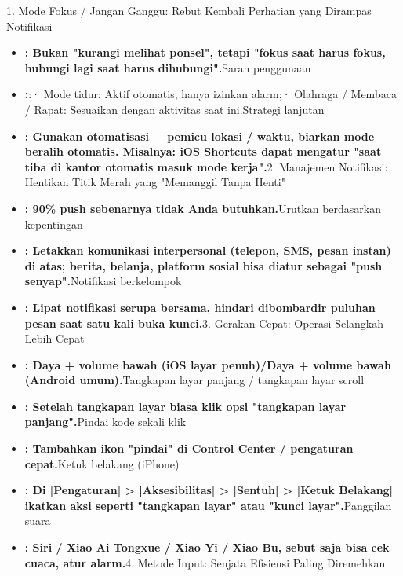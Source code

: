 
1. Mode Fokus / Jangan Ganggu: Rebut Kembali Perhatian yang Dirampas Notifikasi


\begin{itemize}
  \item \textbf{: Bukan "kurangi melihat ponsel", tetapi "fokus saat harus fokus, hubungi lagi saat harus dihubungi".}Saran penggunaan
  \item \textbf{:}:\newline · Mode tidur: Aktif otomatis, hanya izinkan alarm;\newline · Olahraga / Membaca / Rapat: Sesuaikan dengan aktivitas saat ini.\newline Strategi lanjutan
  \item \textbf{: Gunakan otomatisasi + pemicu lokasi / waktu, biarkan mode beralih otomatis. Misalnya: iOS Shortcuts dapat mengatur "saat tiba di kantor otomatis masuk mode kerja".}2. Manajemen Notifikasi: Hentikan Titik Merah yang "Memanggil Tanpa Henti"
\end{itemize}


\begin{itemize}
  \item \textbf{: 90\% push sebenarnya tidak Anda butuhkan.}Urutkan berdasarkan kepentingan
  \item \textbf{: Letakkan komunikasi interpersonal (telepon, SMS, pesan instan) di atas; berita, belanja, platform sosial bisa diatur sebagai "push senyap".}Notifikasi berkelompok
  \item \textbf{: Lipat notifikasi serupa bersama, hindari dibombardir puluhan pesan saat satu kali buka kunci.}3. Gerakan Cepat: Operasi Selangkah Lebih Cepat
\end{itemize}


\begin{itemize}
  \item \textbf{: Daya + volume bawah (iOS layar penuh)/Daya + volume bawah (Android umum).}Tangkapan layar panjang / tangkapan layar scroll
  \item \textbf{: Setelah tangkapan layar biasa klik opsi "tangkapan layar panjang".}Pindai kode sekali klik
  \item \textbf{: Tambahkan ikon "pindai" di Control Center / pengaturan cepat.}Ketuk belakang (iPhone)
  \item \textbf{: Di [Pengaturan] > [Aksesibilitas] > [Sentuh] > [Ketuk Belakang] ikatkan aksi seperti "tangkapan layar" atau "kunci layar".}Panggilan suara
  \item \textbf{: Siri / Xiao Ai Tongxue / Xiao Yi / Xiao Bu, sebut saja bisa cek cuaca, atur alarm.}4. Metode Input: Senjata Efisiensi Paling Diremehkan
\end{itemize}

